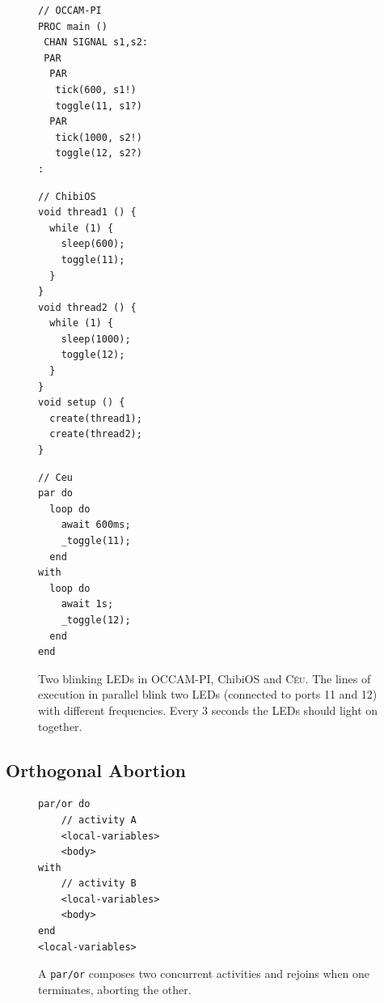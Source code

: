 \documentclass{acm_proc_article-sp}
\newcommand{\CEU}{\textsc{C\'{e}u}\xspace}
\newcommand{\code}[1] {{\small{\texttt{#1}}}}
\newcommand{\1}{\;}
\newcommand{\2}{\;\;}
\newcommand{\3}{\;\;\;}
\newcommand{\5}{\;\;\;\;\;}
\begin{document}
\begin{figure}[t]
\begin{minipage}[t]{0.34\linewidth}
\begin{lstlisting}
// OCCAM-PI
PROC main ()
 CHAN SIGNAL s1,s2:
 PAR
  PAR
   tick(600, s1!)
   toggle(11, s1?)
  PAR
   tick(1000, s2!)
   toggle(12, s2?)
:

\end{lstlisting}
\end{minipage}
%
\begin{minipage}[t]{0.33\linewidth}
\begin{lstlisting}
// ChibiOS
void thread1 () {
  while (1) {
    sleep(600);
    toggle(11);
  }
}
void thread2 () {
  while (1) {
    sleep(1000);
    toggle(12);
  }
}
void setup () {
  create(thread1);
  create(thread2);
}

\end{lstlisting}
\end{minipage}
%
\begin{minipage}[t]{0.31\linewidth}
\begin{lstlisting}
// Ceu
par do
  loop do
    await 600ms;
    _toggle(11);
  end
with
  loop do
    await 1s;
    _toggle(12);
  end
end
\end{lstlisting}
\end{minipage}
%
\caption{ Two blinking LEDs in OCCAM-PI, ChibiOS and \CEU.\newline
{\small %
The lines of execution in parallel blink two LEDs (connected to ports 11 and 
12) with different frequencies.
Every 3 seconds the LEDs should light on together.
}%
\label{lst.leds}
}
\end{figure}


\subsection{Orthogonal Abortion}

\begin{figure}[t]
\begin{lstlisting}
par/or do
    // activity A
    <local-variables>
    <body>
with
    // activity B
    <local-variables>
    <body>
end
<local-variables>
\end{lstlisting}
\caption{ A \code{par/or} composes two concurrent activities and rejoins when 
one terminates, aborting the other.
\label{lst.abortion}
}
\end{figure}
\end{document}

